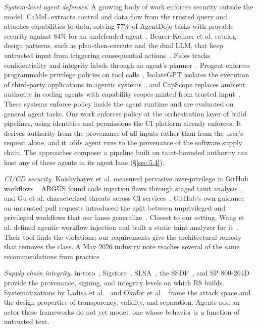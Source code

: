 \documentclass[acmsmall,screen,review]{acmart}
\begin{document}
\emph{System-level agent defenses.} A growing body of work enforces security outside the model. CaMeL extracts control and data flow from the trusted query and attaches capabilities to data, solving 77\% of AgentDojo tasks with provable security against 84\% for an undefended agent~\cite{debenedetti2025defeating}. Beurer-Kellner et al. catalog design patterns, such as plan-then-execute and the dual LLM, that keep untrusted input from triggering consequential actions~\cite{beurerkellner2025design}. Fides tracks confidentiality and integrity labels through an agent's planner~\cite{costa2025securing}. Progent enforces programmable privilege policies on tool calls~\cite{shi2025progent}, IsolateGPT isolates the execution of third-party applications in agentic systems~\cite{wu2025isolategpt}, and CapScope replaces ambient authority in coding agents with capability scopes minted from trusted input~\cite{bouras2026authority}. These systems enforce policy inside the agent runtime and are evaluated on general agent tasks. Our work enforces policy at the orchestration layer of build pipelines, using identities and permissions the CI platform already enforces. It derives authority from the provenance of all inputs rather than from the user's request alone, and it adds agent runs to the provenance of the software supply chain. The approaches compose: a pipeline built on taint-bounded authority can host any of these agents in its agent lane (\S\ref{sec:5.4}).

\emph{CI/CD security.} Koishybayev et al. measured pervasive over-privilege in GitHub workflows~\cite{koishybayev2022characterizing}. ARGUS found code injection flaws through staged taint analysis~\cite{muralee2023argus}, and Gu et al. characterized threats across CI services~\cite{gu2023continuous}. GitHub's own guidance on untrusted pull requests introduced the split between unprivileged and privileged workflows that our lanes generalize~\cite{lobavcevski2021keeping}. Closest to our setting, Wang et al. defined agentic workflow injection and built a static taint analyzer for it~\cite{wang2026demystifying}. Their tool finds the violations; our requirements give the architectural remedy that removes the class. A May 2026 industry note reaches several of the same recommendations from practice~\cite{cloud2026prompt}.

\emph{Supply chain integrity.} in-toto~\cite{torresarias2019toto}, Sigstore~\cite{newman2022sigstore}, SLSA~\cite{openndslsa}, the SSDF~\cite{souppaya2022secure,booth2025secure}, and SP 800-204D~\cite{chandramouli2024strategies} provide the provenance, signing, and integrity levels on which R8 builds. Systematizations by Ladisa et al.~\cite{ladisa2023sok} and Okafor et al.~\cite{okafor2022sok} frame the attack space and the design properties of transparency, validity, and separation. Agents add an actor these frameworks do not yet model: one whose behavior is a function of untrusted text.
\end{document}

